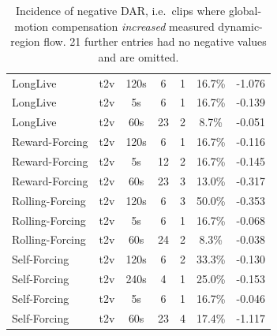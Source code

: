 \begin{table}[!htbp]
\begin{tabular}{lcccccc}
LongLive & t2v & 120s & 6 & 1 & 16.7\% & -1.076 \\
LongLive & t2v & 5s & 6 & 1 & 16.7\% & -0.139 \\
LongLive & t2v & 60s & 23 & 2 & 8.7\% & -0.051 \\
Reward-Forcing & t2v & 120s & 6 & 1 & 16.7\% & -0.116 \\
Reward-Forcing & t2v & 5s & 12 & 2 & 16.7\% & -0.145 \\
Reward-Forcing & t2v & 60s & 23 & 3 & 13.0\% & -0.317 \\
Rolling-Forcing & t2v & 120s & 6 & 3 & 50.0\% & -0.353 \\
Rolling-Forcing & t2v & 5s & 6 & 1 & 16.7\% & -0.068 \\
Rolling-Forcing & t2v & 60s & 24 & 2 & 8.3\% & -0.038 \\
Self-Forcing & t2v & 120s & 6 & 2 & 33.3\% & -0.130 \\
Self-Forcing & t2v & 240s & 4 & 1 & 25.0\% & -0.153 \\
Self-Forcing & t2v & 5s & 6 & 1 & 16.7\% & -0.046 \\
Self-Forcing & t2v & 60s & 23 & 4 & 17.4\% & -1.117 \\
\bottomrule
\end{tabular}
\caption{Incidence of negative DAR, i.e.\ clips where global-motion compensation \emph{increased} measured dynamic-region flow. 21 further entries had no negative values and are omitted.}
\label{tab:darneg}
\end{table}